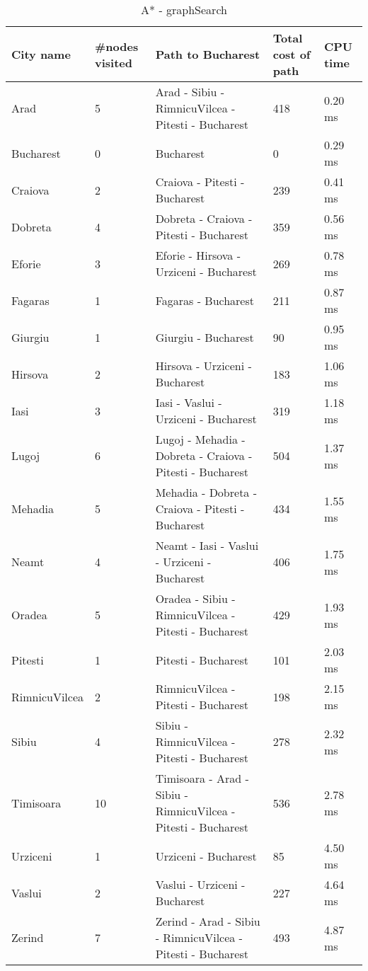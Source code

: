 \documentclass[a4paper]{article}
\begin{document}
\begin {table}[H]
\caption {A* - graphSearch}
\begin{center}
\begin{tabular}{ | l | l |  p{5cm} | l | l |} \hline
City name & \multicolumn{1}{l|}{\#nodes visited} & \multicolumn{1}{l|}{Path to Bucharest} & \multicolumn{1}{l|}{Total cost of path} & \multicolumn{1}{l|}{CPU time} \\ \hline
Arad & 5 & Arad - Sibiu - RimnicuVilcea - Pitesti - Bucharest & 418 & 0.20 ms \\ \hline
Bucharest & 0 & Bucharest & 0 & 0.29 ms \\ \hline
Craiova & 2 & Craiova - Pitesti - Bucharest & 239 & 0.41 ms \\ \hline
Dobreta & 4 & Dobreta - Craiova - Pitesti - Bucharest & 359 & 0.56 ms \\ \hline
Eforie & 3 & Eforie - Hirsova - Urziceni - Bucharest & 269 & 0.78 ms \\ \hline
Fagaras & 1 & Fagaras - Bucharest & 211 & 0.87 ms \\ \hline
Giurgiu & 1 & Giurgiu - Bucharest & 90 & 0.95 ms \\ \hline
Hirsova & 2 & Hirsova - Urziceni - Bucharest & 183 & 1.06 ms \\ \hline
Iasi & 3 & Iasi - Vaslui - Urziceni - Bucharest & 319 & 1.18 ms \\ \hline
Lugoj & 6 & Lugoj - Mehadia - Dobreta - Craiova - Pitesti - Bucharest & 504 & 1.37 ms \\ \hline
Mehadia & 5 & Mehadia - Dobreta - Craiova - Pitesti - Bucharest & 434 & 1.55 ms \\ \hline
Neamt & 4 & Neamt - Iasi - Vaslui - Urziceni - Bucharest & 406 & 1.75 ms \\ \hline
Oradea & 5 & Oradea - Sibiu - RimnicuVilcea - Pitesti - Bucharest & 429 & 1.93 ms \\ \hline
Pitesti & 1 & Pitesti - Bucharest & 101 & 2.03 ms \\ \hline
RimnicuVilcea & 2 & RimnicuVilcea - Pitesti - Bucharest & 198 & 2.15 ms \\ \hline
Sibiu & 4 & Sibiu - RimnicuVilcea - Pitesti - Bucharest & 278 & 2.32 ms \\ \hline
Timisoara & 10 & Timisoara - Arad - Sibiu - RimnicuVilcea - Pitesti - Bucharest & 536 & 2.78 ms \\ \hline
Urziceni & 1 & Urziceni - Bucharest & 85 & 4.50 ms \\ \hline
Vaslui & 2 & Vaslui - Urziceni - Bucharest & 227 & 4.64 ms \\ \hline
Zerind & 7 & Zerind - Arad - Sibiu - RimnicuVilcea - Pitesti - Bucharest & 493 & 4.87 ms \\ \hline
\end{tabular}
\end{center}
\end {table}
\end{document}
